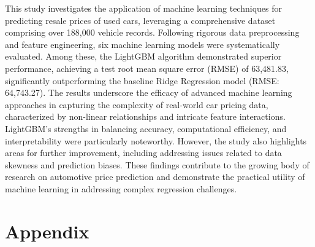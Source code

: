 \documentclass{article}
\begin{document}
This study investigates the application of machine learning techniques for predicting resale prices of used cars, leveraging a comprehensive dataset comprising over 188,000 vehicle records. Following rigorous data preprocessing and feature engineering, six machine learning models were systematically evaluated. Among these, the LightGBM algorithm demonstrated superior performance, achieving a test root mean square error (RMSE) of 63,481.83, significantly outperforming the baseline Ridge Regression model (RMSE: 64,743.27). The results underscore the efficacy of advanced machine learning approaches in capturing the complexity of real-world car pricing data, characterized by non-linear relationships and intricate feature interactions. LightGBM's strengths in balancing accuracy, computational efficiency, and interpretability were particularly noteworthy. However, the study also highlights areas for further improvement, including addressing issues related to data skewness and prediction biases. These findings contribute to the growing body of research on automotive price prediction and demonstrate the practical utility of machine learning in addressing complex regression challenges.




\newpage

\appendix

\section{Appendix}
\end{document}

